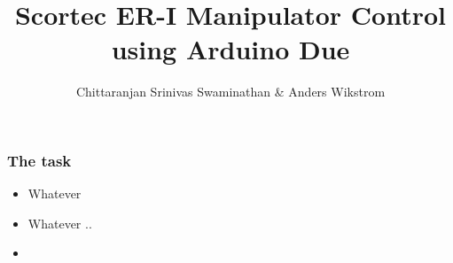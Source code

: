 \documentclass{beamer}
\title[Sensors Assignment 3] %
{Scortec ER-I Manipulator Control using Arduino Due}
\author %
{Chittaranjan Srinivas Swaminathan \& Anders Wikstrom}
\institute{Orebro University}
\begin{document}
\frame{\titlepage}
  \begin{frame}
    \frametitle{The task}
    \begin{itemize}
      \item<1-> Whatever
      \item<2-> Whatever ..
      \item<3-> 
    \end{itemize}
  \end{frame}
\end{document}
